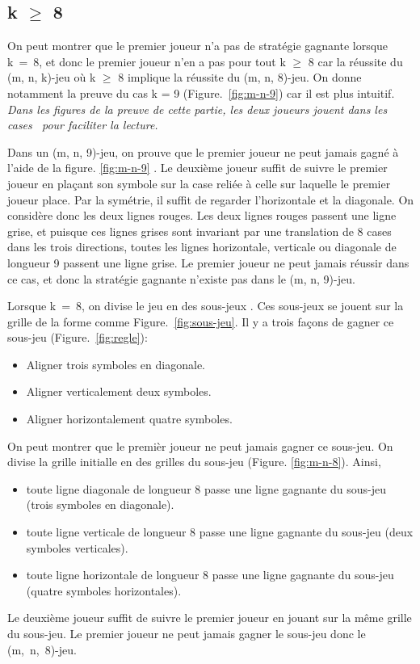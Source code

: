 \documentclass[12pt, a4paper]{article}
\begin{document}
\subsection{k $\ge$ 8}
On peut montrer que le premier joueur n'a pas de stratégie gagnante lorsque k~=~8, et donc le premier joueur n'en a pas pour tout k $\ge$ 8 car la réussite du (m, n, k)-jeu où k $\ge$ 8 implique la réussite du (m, n, 8)-jeu. On donne notamment la preuve du cas k = 9 \mbox{(Figure. \ref{fig:m-n-9})} car il est plus intuitif.\\
\textit{Dans les figures de la preuve de cette partie, les deux joueurs jouent \og dans les cases \fg \ pour faciliter la lecture.}\par

Dans un (m, n, 9)-jeu, on prouve que le premier joueur ne peut jamais gagné à l'aide de la figure. \ref{fig:m-n-9} \cite{9-win}. Le deuxième joueur suffit de suivre le premier joueur en plaçant son symbole sur la case reliée à celle sur laquelle le premier joueur place. Par la symétrie, il suffit de regarder l'horizontale et la diagonale. On considère donc les deux lignes rouges. Les deux lignes rouges passent une ligne grise, et puisque ces lignes grises sont invariant par une translation de 8 cases dans les trois directions, toutes les lignes horizontale, verticale ou diagonale de longueur 9 passent une ligne grise. Le premier joueur ne peut jamais réussir dans ce cas, et donc la stratégie gagnante n'existe pas dans le (m, n, 9)-jeu.\par
Lorsque k~=~8, on divise le jeu en des sous-jeux \cite{8-win}. Ces sous-jeux se jouent sur la grille de la forme comme \mbox{Figure. \ref{fig:sous-jeu}.}
Il y a trois façons de gagner ce sous-jeu \mbox{(Figure. \ref{fig:regle}):}
\begin{itemize}
    \item Aligner trois symboles en diagonale.
    \item Aligner verticalement deux symboles.
    \item Aligner horizontalement quatre symboles.
\end{itemize}
On peut montrer que le premièr joueur ne peut jamais gagner ce sous-jeu. On divise la grille initialle en des grilles du sous-jeu (Figure. \ref{fig:m-n-8}). Ainsi, 
\begin{itemize}
    \item toute ligne diagonale de longueur 8 passe une ligne gagnante du sous-jeu (trois symboles en diagonale).
    \item toute ligne verticale de longueur 8 passe une ligne gagnante du sous-jeu (deux symboles verticales).
    \item toute ligne horizontale de longueur 8 passe une ligne gagnante du sous-jeu (quatre symboles horizontales).
\end{itemize}
Le deuxième joueur suffit de suivre le premier joueur en jouant sur la même grille du sous-jeu. Le premier joueur ne peut jamais gagner le sous-jeu donc le \mbox{(m, n, 8)-jeu}.
\end{document}
